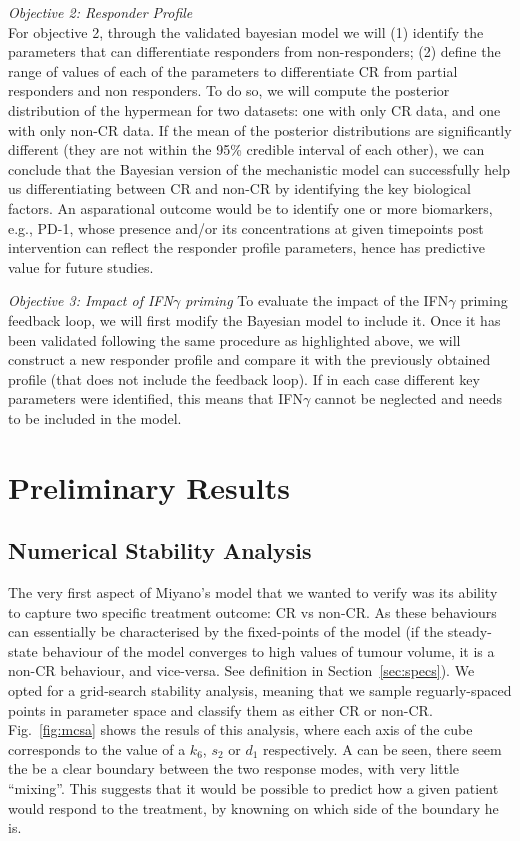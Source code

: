 \documentclass[11pt]{article}
\begin{document}
\textit{Objective 2: Responder Profile}\\[3pt]
For objective 2, through the validated bayesian model we will (1) identify the parameters that can differentiate responders from non-responders; (2) define the range of values of each of the parameters to differentiate CR from partial responders and non responders. To do so, we will compute the posterior distribution of the hypermean for two datasets: one with only CR data, and one with only non-CR data. If the mean of the posterior distributions are significantly different (they are not within the 95\% credible interval of each other), we can conclude that the Bayesian version of the mechanistic model can successfully help us differentiating between CR and non-CR by identifying the key biological factors. An asparational outcome would be to identify one or more biomarkers, e.g., PD-1, whose presence and/or its concentrations at given timepoints post intervention can reflect the responder profile parameters, hence has predictive value for future studies.

\textit{Objective 3: Impact of IFN$\gamma$ priming}
To evaluate the impact of the IFN$\gamma$ priming feedback loop, we will first modify the Bayesian model to include it. Once it has been validated following the same procedure as highlighted above, we will construct a new responder profile and compare it with the previously obtained profile (that does not include the feedback loop). If in each case different key parameters were identified, this means that IFN$\gamma$ cannot be neglected and needs to be included in the model.

\section{Preliminary Results}

\subsection{Numerical Stability Analysis}

The very first aspect of Miyano's model that we wanted to verify was its ability to capture two specific treatment outcome: CR vs non-CR. As these behaviours can essentially be characterised by the fixed-points of the model (if the steady-state behaviour of the model converges to high values of tumour volume, it is a non-CR behaviour, and vice-versa. See definition in Section~\ref{sec:specs}). We opted for a grid-search stability analysis, meaning that we sample reguarly-spaced points in parameter space and classify them as either CR or non-CR. Fig.~\ref{fig:mcsa} shows the resuls of this analysis, where each axis of the cube corresponds to the value of a $k_6$, $s_2$ or $d_1$ respectively. A can be seen, there seem the be a clear boundary between the two response modes, with very little ``mixing''. This suggests that it would be possible to predict how a given patient would respond to the treatment, by knowning on which side of the boundary he is.
\end{document}
